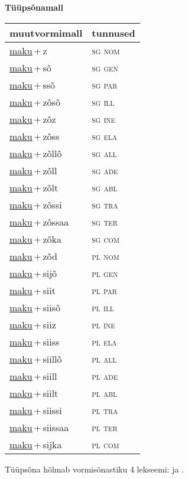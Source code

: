 
\vspace{1.8em}
\begin{minipage}{\textwidth}
\textbf{Tüüpsõnamall \,}\\

\begin{sideways}
\begin{tabular}{l l}
muutvormimall & tunnused \\
\hline
\underline{maku}\,+\,z & \textsc{ sg nom } \\
\underline{maku}\,+\,sõ & \textsc{ sg gen } \\
\underline{maku}\,+\,ssõ & \textsc{ sg par } \\
\underline{maku}\,+\,zõsõ & \textsc{ sg ill } \\
\underline{maku}\,+\,zõz & \textsc{ sg ine } \\
\underline{maku}\,+\,zõss & \textsc{ sg ela } \\
\underline{maku}\,+\,zõllõ & \textsc{ sg all } \\
\underline{maku}\,+\,zõll & \textsc{ sg ade } \\
\underline{maku}\,+\,zõlt & \textsc{ sg abl } \\
\underline{maku}\,+\,zõssi & \textsc{ sg tra } \\
\underline{maku}\,+\,zõssaa & \textsc{ sg ter } \\
\underline{maku}\,+\,zõka & \textsc{ sg com } \\
\underline{maku}\,+\,zõd & \textsc{ pl nom } \\
\underline{maku}\,+\,sijõ & \textsc{ pl gen } \\
\underline{maku}\,+\,siit & \textsc{ pl par } \\
\underline{maku}\,+\,siisõ & \textsc{ pl ill } \\
\underline{maku}\,+\,siiz & \textsc{ pl ine } \\
\underline{maku}\,+\,siiss & \textsc{ pl ela } \\
\underline{maku}\,+\,siillõ & \textsc{ pl all } \\
\underline{maku}\,+\,siill & \textsc{ pl ade } \\
\underline{maku}\,+\,siilt & \textsc{ pl abl } \\
\underline{maku}\,+\,siissi & \textsc{ pl tra } \\
\underline{maku}\,+\,siissaa & \textsc{ pl ter } \\
\underline{maku}\,+\,sijka & \textsc{ pl com } \\
\end{tabular}
\end{sideways}
\label{tab:tüüpsõnamall-makuz}

\end{minipage}

 
\vspace{1em}
\noindent Tüüpsõna hõlmab vormisõnastiku 4 lekseemi:  ja .

